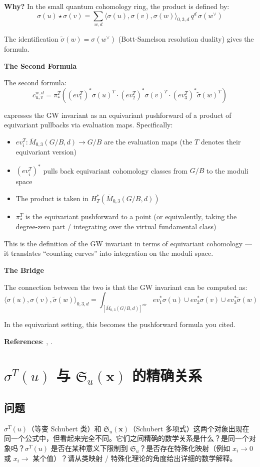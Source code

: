 \textbf{Why?} In the small quantum cohomology ring, the product is defined by:
$$\sigma(u) \star \sigma(v) = \sum_{w,d} \langle \sigma(u), \sigma(v), \sigma(w) \rangle_{0,3,d} \, q^d \, \sigma(w^\vee)$$

The identification $\widetilde{\sigma}(w) = \sigma(w^\vee)$ (Bott-Samelson resolution duality) gives the formula.

\textbf{The Second Formula}

The second formula:
$$c_{u,v}^{w,d} = \pi_*^T\left((ev_1^T)^* \sigma(u)^T \cdot (ev_2^T)^* \sigma(v)^T \cdot (ev_3^T)^* \widetilde{\sigma}(w)^T\right)$$

expresses the GW invariant as an equivariant pushforward of a product of equivariant pullbacks via evaluation maps. Specifically:
\begin{itemize}
\item $ev_i^T: \overline{M}_{0,3}(G/B, d) \to G/B$ are the evaluation maps (the $T$ denotes their equivariant version)
\item $(ev_i^T)^*$ pulls back equivariant cohomology classes from $G/B$ to the moduli space
\item The product is taken in $H_T^*(\overline{M}_{0,3}(G/B, d))$
\item $\pi_*^T$ is the equivariant pushforward to a point (or equivalently, taking the degree-zero part / integrating over the virtual fundamental class)
\end{itemize}

This is the definition of the GW invariant in terms of equivariant cohomology --- it translates ``counting curves'' into integration on the moduli space.

\textbf{The Bridge}

The connection between the two is that the GW invariant can be computed as:
$$\langle \sigma(u), \sigma(v), \widetilde{\sigma}(w) \rangle_{0,3,d} = \int_{[\overline{M}_{0,3}(G/B, d)]^{vir}} ev_1^* \sigma(u) \cup ev_2^* \sigma(v) \cup ev_3^* \widetilde{\sigma}(w)$$

In the equivariant setting, this becomes the pushforward formula you cited.

\textbf{References}: \cite{FultonQuntum1997}, \cite{Kim2000}.

\section{$\sigma^T(u)$ 与 $\mathfrak{S}_u(\mathbf{x})$ 的精确关系}\label{sec:qa-sigma-vs-Schubert-polynomial}
\subsection{问题}
$\sigma^T(u)$（等变 Schubert 类）和 $\mathfrak{S}_u(\mathbf{x})$（Schubert 多项式）这两个对象出现在同一个公式中，但看起来完全不同。它们之间精确的数学关系是什么？是同一个对象吗？$\sigma^T(u)$ 是否在某种意义下限制到 $\mathfrak{S}_u$？是否存在特殊化映射（例如 $x_i \to 0$ 或 $x_i \to$ 某个值）？请从类映射 / 特殊化理论的角度给出详细的数学解释。

